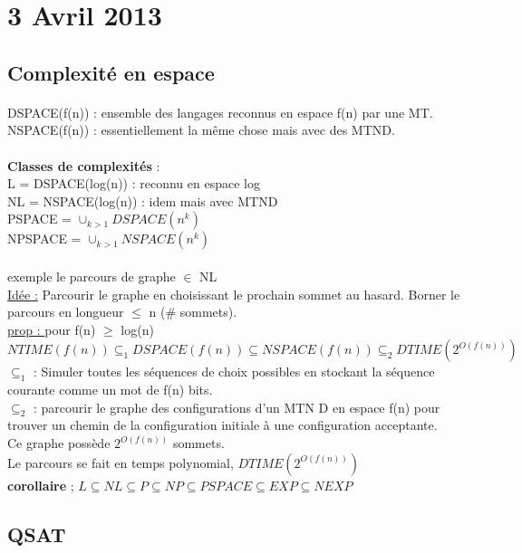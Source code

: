 \documentclass{article}
\begin{document}
\section{3 Avril 2013}
\subsection{Complexité en espace} 
\paragraph{} DSPACE(f(n)) : ensemble des langages reconnus en espace f(n) par une MT.\\
NSPACE(f(n)) : essentiellement la même chose mais avec des MTND.\\\\

\textbf{Classes de complexités} :\\
L = DSPACE(log(n)) : reconnu en espace log\\
NL = NSPACE(log(n)) : idem mais avec MTND\\
PSPACE = $\cup_{k>1} DSPACE(n^k)$\\
NPSPACE = $\cup_{k>1} NSPACE(n^k)$\\\\

exemple le parcours de graphe $\in$ NL\\\underline{Idée :} Parcourir le graphe en choisissant le prochain sommet au hasard. Borner le parcours en longueur $\leq$ n (\# sommets). \\
\underline{prop : } pour f(n) $\geq$ log(n)\\
$NTIME(f(n)) \subseteq_1 DSPACE(f(n)) \subseteq NSPACE(f(n)) \subseteq_2 DTIME(2^{O(f(n))})$\\
$\subseteq_1$ : Simuler toutes les séquences de choix possibles en stockant la séquence courante comme un mot de f(n) bits. \\
$\subseteq_2$ : parcourir le graphe des configurations d'un MTN
D en espace f(n) pour trouver un chemin de la configuration initiale à une configuration acceptante.\\
Ce graphe possède $2^{O(f(n))}$ sommets.\\
Le parcours se fait en temps polynomial, $ DTIME(2^{O(f(n))})$\\
\textbf{corollaire} ; $ L\subseteq NL \subseteq P \subseteq NP \subseteq PSPACE \subseteq EXP \subseteq NEXP$

\subsection{QSAT}
\end{document}
